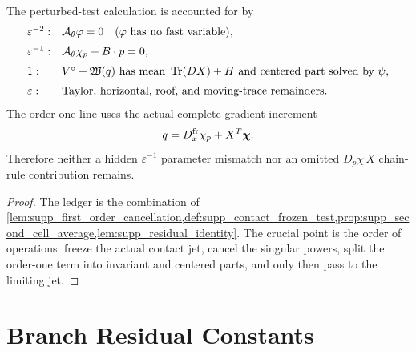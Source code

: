 \begin{proposition}
\label{prop:supp_four_scale_ledger}
The perturbed-test calculation is accounted for by
\[
\begin{array}{ll}
\varepsilon^{-2}:&
  \mathcal A_\theta\varphi=0\quad(\varphi\text{ has no fast variable}),\\[2mm]
\varepsilon^{-1}:&
  \mathcal A_\theta\chi_p+B\cdot p=0,\\[2mm]
1:&
  V^\circ+\mathfrak W(q)
  \text{ has mean }\operatorname{Tr}(DX)+H
  \text{ and centered part solved by }\psi,\\[2mm]
\varepsilon:&
  \text{Taylor, horizontal, roof, and moving-trace remainders}.
\end{array}
\]
The order-one line uses the actual complete gradient increment
\[
  q=D_x^{\rm fr}\chi_p+X^T\boldsymbol\chi .
\]
Therefore neither a hidden
\(\varepsilon^{-1}\) parameter mismatch nor an omitted
\(D_p\chi\,X\) chain-rule contribution remains.
\end{proposition}

\begin{proof}
The ledger is the combination of
\cref{lem:supp_first_order_cancellation,def:supp_contact_frozen_test,prop:supp_second_cell_average,lem:supp_residual_identity}.
The crucial point is the order of operations: freeze the actual contact jet,
cancel the singular powers, split the order-one term into invariant and
centered parts, and only then pass to the limiting jet.
\end{proof}

\section{Branch Residual Constants}

